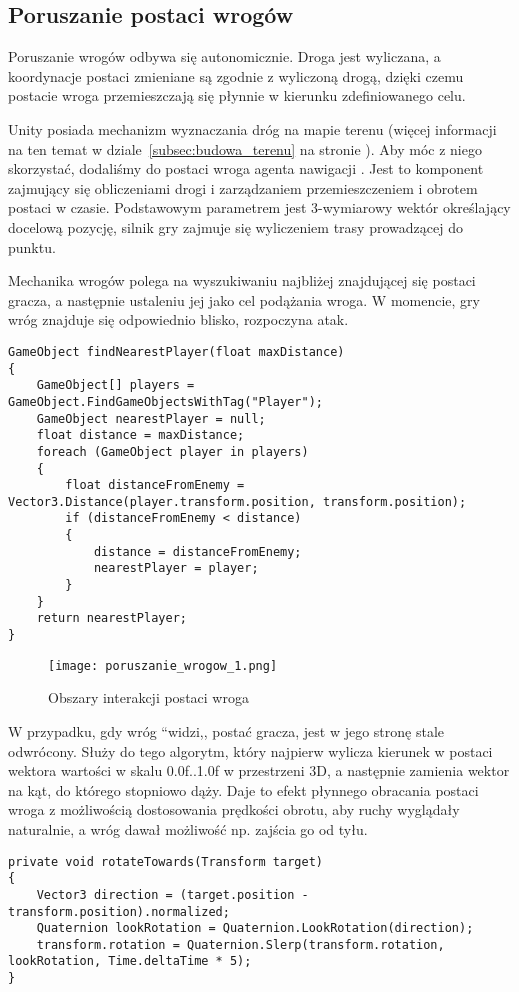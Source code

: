 \subsection{Poruszanie postaci wrogów}\label{subsec:poruszanie_wrogow}

Poruszanie wrogów odbywa się autonomicznie. Droga jest wyliczana, a koordynacje postaci zmieniane są zgodnie z wyliczoną drogą, dzięki czemu postacie wroga przemieszczają się płynnie w kierunku zdefiniowanego celu.

Unity posiada mechanizm wyznaczania dróg na mapie terenu (więcej informacji na ten temat w dziale~\ref{subsec:budowa_terenu} na stronie \pageref{subsec:budowa_terenu}). Aby móc z niego skorzystać, dodaliśmy do postaci wroga agenta nawigacji . Jest to komponent zajmujący się obliczeniami drogi i zarządzaniem przemieszczeniem i obrotem postaci w czasie. Podstawowym parametrem jest 3-wymiarowy wektór określający docelową pozycję, silnik gry zajmuje się wyliczeniem trasy prowadzącej do punktu.

Mechanika wrogów polega na wyszukiwaniu najbliżej znajdującej się postaci gracza, a następnie ustaleniu jej jako cel podążania wroga. W momencie, gry wróg znajduje się odpowiednio blisko, rozpoczyna atak.
\\
\begin{lstlisting}[caption={Algorytm zwracający wskaźnik do obiektu znajdującego się najbliżej, przy określonym maksymalnym promieniu poszukiwań}]
GameObject findNearestPlayer(float maxDistance)
{
    GameObject[] players = GameObject.FindGameObjectsWithTag("Player");
    GameObject nearestPlayer = null;
    float distance = maxDistance;
    foreach (GameObject player in players)
    {
        float distanceFromEnemy = Vector3.Distance(player.transform.position, transform.position);
        if (distanceFromEnemy < distance)
        {
            distance = distanceFromEnemy;
            nearestPlayer = player;
        }
    }
    return nearestPlayer;
}
\end{lstlisting}

\begin{figure}[H]
\center
\texttt{[image: poruszanie\_wrogow\_1.png]}
\caption{Obszary interakcji postaci wroga}
\end{figure}

W przypadku, gdy wróg ``widzi,, postać gracza, jest w jego stronę stale odwrócony. Służy do tego algorytm, który najpierw wylicza kierunek w postaci wektora wartości w skalu 0.0f..1.0f w przestrzeni 3D, a następnie zamienia wektor na kąt, do którego stopniowo dąży. Daje to efekt płynnego obracania postaci wroga z możliwością dostosowania prędkości obrotu, aby ruchy wyglądały naturalnie, a wróg dawał możliwość np. zajścia go od tyłu.
\\
\begin{lstlisting}[caption={Algorytm obracania postaci wroga w kierunku gracza}]
private void rotateTowards(Transform target)
{
    Vector3 direction = (target.position - transform.position).normalized;
    Quaternion lookRotation = Quaternion.LookRotation(direction);
    transform.rotation = Quaternion.Slerp(transform.rotation, lookRotation, Time.deltaTime * 5);
}
\end{lstlisting}
